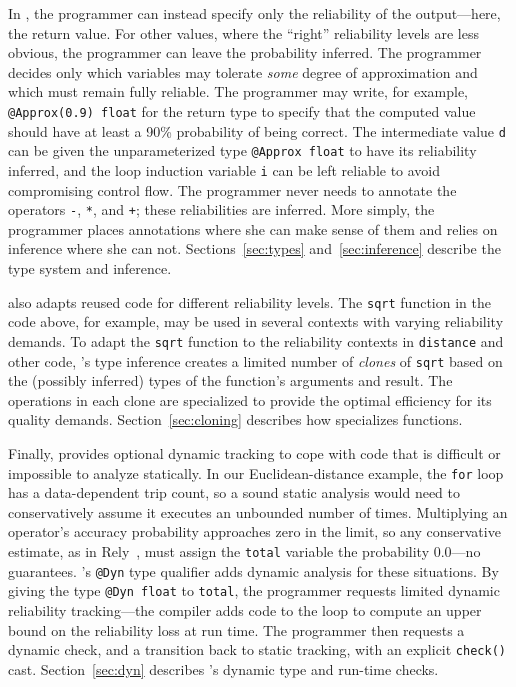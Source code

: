 \documentclass[10pt,nocopyrightspace,preprint]{sigplanconf}
\newcommand{\code}{\lstinline[emphstyle={},keywordstyle={}]}
\begin{document}
In \lang, the programmer can instead specify only the reliability of the
output---here, the return value.
For other values, where the ``right'' reliability levels are less obvious, the
programmer can leave the probability inferred.
The programmer decides only which variables may tolerate \emph{some} degree of
approximation and which must remain fully reliable.
The programmer may write, for example, \code{@Approx(0.9) float} for the
return type to specify that the computed value should have at least a 90\%
probability of being correct.
The intermediate value \code{d} can be given the
unparameterized type \code{@Approx float} to have its reliability inferred, and
the loop induction variable \code{i} can be left reliable to avoid compromising
control flow.
The programmer never needs to annotate the
operators \code{-}, \code{*}, and \code{+}; these reliabilities are inferred.
More simply, the programmer places annotations where she can make sense of
them and relies on inference where she can not.
Sections~\ref{sec:types} and~\ref{sec:inference} describe the type system and
inference.

\lang also adapts reused code for different reliability levels.
The \code{sqrt} function in the code above, for example, may be used in
several contexts with varying reliability demands.
To adapt the \code{sqrt} function to the reliability contexts in \code{distance}
and other code,
\lang's type inference creates a limited number of \emph{clones} of
\code{sqrt} based on the (possibly inferred) types of the function's arguments
and result.
The operations in each clone are specialized to provide the optimal efficiency
for its quality demands.
Section~\ref{sec:cloning} describes how \lang specializes
functions.

Finally, \lang provides optional dynamic tracking to cope with code that
is difficult or impossible to analyze statically.
In our Euclidean-distance example, the \code{for} loop has a data-dependent
trip count, so a sound static analysis would need to conservatively assume it
executes an unbounded number of times.
Multiplying an operator's accuracy probability approaches zero in the limit,
so any conservative estimate, as in Rely~\cite{rely},
must assign the \code{total} variable
the probability 0.0---no guarantees.
\lang's \code{@Dyn} type qualifier adds dynamic analysis for
these situations.
By giving the type \code{@Dyn float} to \code{total}, the programmer
requests limited dynamic reliability tracking---the
compiler adds code to the loop to compute an upper bound on the reliability
loss at run time.
The programmer then requests a dynamic check, and a transition back to static
tracking, with an explicit \code{check()} cast.
Section~\ref{sec:dyn} describes \lang's dynamic type and run-time checks.
\end{document}
